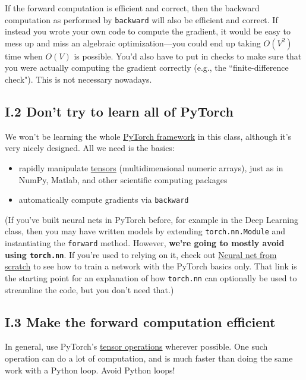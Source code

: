 If the forward computation is efficient and correct, then the backward computation as performed by \texttt{backward} will also be efficient and correct. If instead you wrote your own code to compute the gradient, it would be easy to mess up and miss an algebraic optimization—you could end up taking $O(V^2)$ time when $O(V)$ is possible. You’d also have to put in checks to make sure that you were actually computing the gradient correctly (e.g., the ``finite-difference check"). This is not necessary nowadays.

\subsection*{I.2 Don’t try to learn all of PyTorch}

We won’t be learning the whole \href{https://pytorch.org}{PyTorch framework} in this class, although it’s very nicely designed. All we need is the basics:
\begin{itemize}
    \item rapidly manipulate \href{https://pytorch.org/docs/stable/tensors.html}{tensors} (multidimensional numeric arrays), just as in NumPy, Matlab, and other scientific computing packages
    \item automatically compute gradients via \texttt{backward}
\end{itemize}

(If you’ve built neural nets in PyTorch before, for example in the Deep Learning class, then you may have written models by extending \texttt{torch.nn.Module} and instantiating the \texttt{forward} method. However, \textbf{we’re going to mostly avoid using \texttt{torch.nn}}. If you’re used to relying on it, check out \href{https://pytorch.org/tutorials/beginner/nn_tutorial.html}{Neural net from scratch} to see how to train a network with the PyTorch basics only. That link is the starting point for an explanation of how \texttt{torch.nn} can optionally be used to streamline the code, but you don’t need that.)

\subsection*{I.3 Make the forward computation efficient}

In general, use PyTorch’s \href{https://pytorch.org/docs/stable/tensors.html\#torch.Tensor}{tensor operations} wherever possible. One such operation can do a lot of computation, and is much faster than doing the same work with a Python loop. Avoid Python loops!

